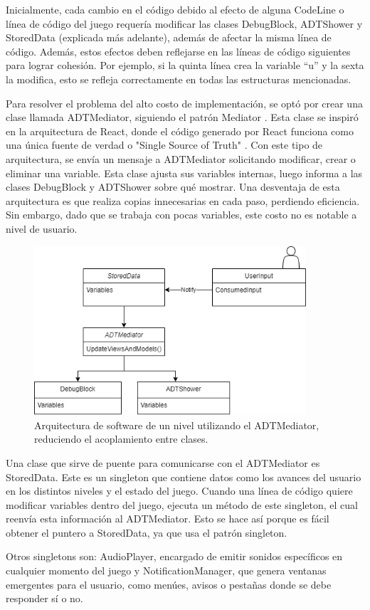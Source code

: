 Inicialmente, cada cambio en el código debido al efecto de alguna CodeLine o línea de código del juego requería modificar las clases DebugBlock, ADTShower y StoredData (explicada más adelante), además de afectar la misma línea de código. Además, estos efectos deben reflejarse en las líneas de código siguientes para lograr cohesión. Por ejemplo, si la quinta línea crea la variable ``u'' y la sexta la modifica, esto se refleja correctamente en todas las estructuras mencionadas.

Para resolver el problema del alto costo de implementación, se optó por crear una clase llamada ADTMediator, siguiendo el patrón Mediator \cite{Freeman2015TheMP}. Esta clase se inspiró en la arquitectura de React, donde el código generado por React funciona como una única fuente de verdad o "Single Source of Truth" \cite{ReactSingleSourceOfTruth}. Con este tipo de arquitectura, se envía un mensaje a ADTMediator solicitando modificar, crear o eliminar una variable. Esta clase ajusta sus variables internas, luego informa a las clases DebugBlock y ADTShower sobre qué mostrar. Una desventaja de esta arquitectura es que realiza copias innecesarias en cada paso, perdiendo eficiencia. Sin embargo, dado que se trabaja con pocas variables, este costo no es notable a nivel de usuario.


\begin{figure}[h!]
	\centering
	\includegraphics[width=0.9\textwidth]{imagenes/ArquitecturaMediatorAfter.png}
	\caption{Arquitectura de software de un nivel utilizando el ADTMediator, reduciendo el acoplamiento entre clases.}
	\label{ArquitecturaMediatorAfter}
\end{figure}

Una clase que sirve de puente para comunicarse con el ADTMediator es StoredData. Este es un singleton que contiene datos como los avances del usuario en los distintos niveles y el estado del juego. Cuando una línea de código quiere modificar variables dentro del juego, ejecuta un método de este singleton, el cual reenvía esta información al ADTMediator. Esto se hace así porque es fácil obtener el puntero a StoredData, ya que usa el patrón singleton.

Otros singletons son: AudioPlayer, encargado de emitir sonidos específicos en cualquier momento del juego y NotificationManager, que genera ventanas emergentes para el usuario, como menúes, avisos o pestañas donde se debe responder sí o no.